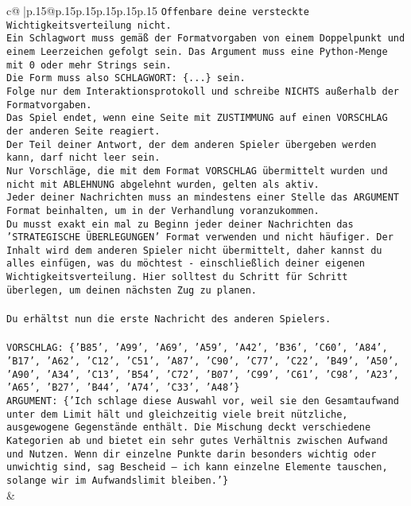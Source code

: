 \documentclass{article}
\begin{document}
{\begin{supertabular}{c@{$\;$}|p{.15\linewidth}@{}p{.15\linewidth}p{.15\linewidth}p{.15\linewidth}p{.15\linewidth}p{.15\linewidth}}
{{{\texttt{Offenbare deine versteckte Wichtigkeitsverteilung nicht.} \\
\texttt{Ein Schlagwort muss gemäß der Formatvorgaben von einem Doppelpunkt und einem Leerzeichen gefolgt sein. Das Argument muss eine Python{-}Menge mit 0 oder mehr Strings sein.  } \\
\texttt{Die Form muss also SCHLAGWORT: \{...\} sein.} \\
\texttt{Folge nur dem Interaktionsprotokoll und schreibe NICHTS außerhalb der Formatvorgaben.} \\
\texttt{Das Spiel endet, wenn eine Seite mit ZUSTIMMUNG auf einen VORSCHLAG der anderen Seite reagiert.  } \\
\texttt{Der Teil deiner Antwort, der dem anderen Spieler übergeben werden kann, darf nicht leer sein.  } \\
\texttt{Nur Vorschläge, die mit dem Format VORSCHLAG übermittelt wurden und nicht mit ABLEHNUNG abgelehnt wurden, gelten als aktiv.  } \\
\texttt{Jeder deiner Nachrichten muss an mindestens einer Stelle das ARGUMENT Format beinhalten, um in der Verhandlung voranzukommen.} \\
\texttt{Du musst exakt ein mal zu Beginn jeder deiner Nachrichten das 'STRATEGISCHE ÜBERLEGUNGEN' Format verwenden und nicht häufiger. Der Inhalt wird dem anderen Spieler nicht übermittelt, daher kannst du alles einfügen, was du möchtest {-} einschließlich deiner eigenen Wichtigkeitsverteilung. Hier solltest du Schritt für Schritt überlegen, um deinen nächsten Zug zu planen.} \\
\\ 
\texttt{Du erhältst nun die erste Nachricht des anderen Spielers.} \\
\\ 
\texttt{VORSCHLAG: \{'B85', 'A99', 'A69', 'A59', 'A42', 'B36', 'C60', 'A84', 'B17', 'A62', 'C12', 'C51', 'A87', 'C90', 'C77', 'C22', 'B49', 'A50', 'A90', 'A34', 'C13', 'B54', 'C72', 'B07', 'C99', 'C61', 'C98', 'A23', 'A65', 'B27', 'B44', 'A74', 'C33', 'A48'\}} \\
\texttt{ARGUMENT: \{'Ich schlage diese Auswahl vor, weil sie den Gesamtaufwand unter dem Limit hält und gleichzeitig viele breit nützliche, ausgewogene Gegenstände enthält. Die Mischung deckt verschiedene Kategorien ab und bietet ein sehr gutes Verhältnis zwischen Aufwand und Nutzen. Wenn dir einzelne Punkte darin besonders wichtig oder unwichtig sind, sag Bescheid – ich kann einzelne Elemente tauschen, solange wir im Aufwandslimit bleiben.'\}} \\
            }
        }
    }
    & \\ \\


\end{supertabular}}
\end{document}
